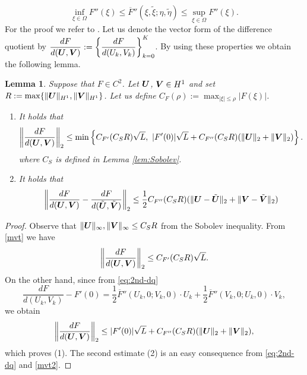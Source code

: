 \documentclass[dvipdfmx-if-dvi,autodetect-engine,ja=standard]{amsart}
\numberwithin{equation}{section} %
\def\vect#1{\mbox{\boldmath $#1$}} %
\newtheorem{lemma}[definition]{Lemma}
\begin{document}
\begin{equation}\label{mvt2}
\inf_{\xi \in \Omega} F''(\xi) \leq \overline{F}''(\xi,\tilde{\xi};\eta,\tilde{\eta}) 
	\leq \sup_{\xi \in \Omega} F''(\xi).  
\end{equation}
For the proof we refer to \cite{yo2}. 
Let us denote the vector form of the difference quotient by
$\dfrac{d F}{d(\vect{U}, \vect{V})} := \left\{ \dfrac{d F}{d(U_k, V_k)} \right\}_{k=0}^K$.
By using these properties we obtain the following lemma. 
\begin{lemma}\label{prop-f}
Suppose that
$F\in C^2$. 
Let
$\vect{U}$, $\vect{V} \in H^1$
and set
$R := \max \{ \| \vect{U} \|_{H^1},  \| \vect{V} \|_{H^1} \}$. 
Let us define $C_{F}(\rho) := \max_{|\xi| \leq \rho} |F(\xi)|$. 
\begin{enumerate}
\item It holds that 
\begin{equation}\label{eq:1st-dq-l2}
\left\| \frac{d F}{d(\vect{U}, \vect{V})} \right\|_2 \leq \min \left\{  C_{F'}(C_S R) \sqrt{L}, \  |F'(0)| \sqrt{L} + C_{F''}(C_S R) (\| \vect{U} \|_2 + \| \vect{V} \|_2) \right\}. 
\end{equation}
where $C_S$ is defined in Lemma \ref{lem:Sobolev}. 
\item It holds that 
\begin{equation}\label{eq:2nd-dq-l2}
\left\| \frac{d F}{d(\vect{U}, \vect{V})} - \frac{d F}{ d(\tilde{\vect{U}}, \tilde{\vect{V}}) }  \right\|_2 \leq
\frac{1}{2} C_{F''}(C_S R) (\| \vect{U} - \tilde{\vect{U}} \|_2 + \| \vect{V} - \tilde{\vect{V}} \|_2)
\end{equation}
\end{enumerate}
\end{lemma}
\begin{proof}
Observe that
$\| \vect{U} \|_{\infty}, \| \vect{V} \|_{\infty} \leq C_S R$
from the Sobolev inequality. 
From \eqref{mvt} we have 
\[
\left\| \frac{d F}{d(\vect{U}, \vect{V})} \right\|_2 \leq C_{F'}(C_S R) \sqrt{L}. 
\]
On the other hand, since from \eqref{eq:2nd-dq} 
\[
\frac{d F}{d(U_k, V_k)} - F'(0) 
	= \frac{1}{2} \overline{F}''(U_k,0;V_k,0) \cdot U_k 
	+  \frac{1}{2} \overline{F}''(V_k,0;U_k,0) \cdot V_k, 
\]
we obtain 
\[
\left\| \frac{d F}{d(\vect{U}, \vect{V})} \right\|_2 \leq |F'(0)| \sqrt{L} + C_{F''}(C_S R) (\| \vect{U} \|_2 + \| \vect{V} \|_2),
\] 
which proves (1). 
The second estimate (2) is an easy consequence from \eqref{eq:2nd-dq} and \eqref{mvt2}. 
\end{proof}
\end{document}
